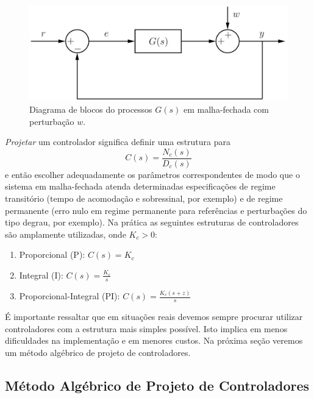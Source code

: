 \documentclass[
]{book}
\providecommand{\tightlist}{%
  \setlength{\itemsep}{0pt}\setlength{\parskip}{0pt}}
\begin{document}
\begin{figure}

{\centering \includegraphics[width=0.8\linewidth]{Imagens/Lab4/Apresentação/fig1} 

}

\caption{Diagrama de blocos do processos $G(s)$ em malha-fechada com perturbação $w$.}\label{fig:fig51}
\end{figure}

\emph{Projetar} um controlador significa definir uma estrutura para
\[
C(s) = \frac {N_c(s)}{D_c(s)}
\]
e então escolher adequadamente os parâmetros correspondentes de modo que o sistema em malha-fechada atenda determinadas especificações de regime transitório (tempo de acomodação e sobressinal, por exemplo) e de regime permanente (erro nulo em regime permanente para referências e perturbações do tipo degrau, por exemplo). Na prática as seguintes estruturas de controladores são amplamente utilizadas, onde \(K_c>0\):

\begin{enumerate}
\def\labelenumi{\arabic{enumi}.}
\tightlist
\item
  Proporcional (P): \(\boxed{C(s) = K_c}\)
\item
  Integral (I): \(\boxed{C(s) = \frac {K_c}{s}}\)
\item
  Proporcional-Integral (PI): \(\boxed{C(s) = \frac{K_c(s+z)}{s}}\)
\end{enumerate}

É importante ressaltar que em situações reais devemos sempre procurar utilizar controladores com a estrutura mais simples possível. Isto implica em menos dificuldades na implementação e em menores custos. Na próxima seção veremos um método algébrico de projeto de controladores.

\hypertarget{muxe9todo-alguxe9brico-de-projeto-de-controladores}{%
\subsection{Método Algébrico de Projeto de Controladores}\label{muxe9todo-alguxe9brico-de-projeto-de-controladores}}
\end{document}
